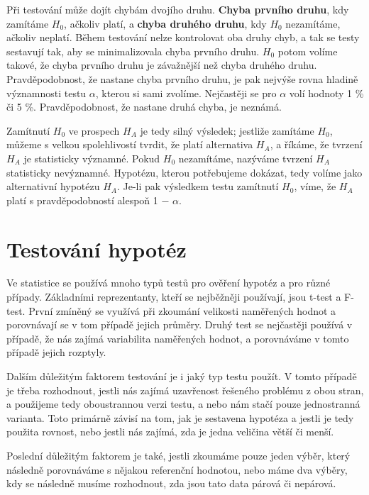 \documentclass[thesis=M,czech]{FITthesis}[2022/10/08]
\begin{document}
Při testování může dojít chybám dvojího druhu. \textbf{Chyba prvního druhu}, kdy zamítáme $H_0$, ačkoliv platí, a \textbf{chyba druhého druhu}, kdy $H_0$ nezamítáme, ačkoliv neplatí. Během testování nelze kontrolovat oba druhy chyb, a tak se testy sestavují tak, aby se minimalizovala chyba prvního druhu. $H_0$  potom volíme takové, že chyba prvního druhu je závažnější než chyba druhého druhu. Pravděpodobnost, že nastane chyba prvního druhu, je pak nejvýše rovna hladině významnosti testu $\alpha$, kterou si sami zvolíme. Nejčastěji se pro $\alpha$ volí hodnoty 1 \% či 5 \%. Pravděpodobnost, že nastane druhá chyba, je neznámá. 

Zamítnutí $H_0$ ve prospech $H_A$ je tedy silný výsledek; jestliže zamítáme $H_0$, můžeme s velkou spolehlivostí tvrdit, že platí alternativa $H_A$, a říkáme, že tvrzení $H_A$ je statisticky významné. Pokud $H_0$ nezamítáme, nazýváme tvrzení $H_A$ statisticky nevýznamné. Hypotézu, kterou potřebujeme dokázat, tedy volíme jako alternativní hypotézu $H_A$. Je-li pak výsledkem testu zamítnutí $H_0$, víme, že $H_A$ platí s pravděpodobností alespoň 1 − $\alpha$.\cite{blazek}

\section{Testování hypotéz}

Ve statistice se používá mnoho typů testů pro ověření hypotéz a pro různé případy. Základními reprezentanty, kteří se nejběžněji používají, jsou t-test a F-test. První zmíněný se využívá při zkoumání velikosti naměřených hodnot a porovnávají se v tom případě jejich průměry. Druhý test se nejčastěji používá v případě, že nás zajímá variabilita naměřených hodnot, a porovnáváme v tomto případě jejich rozptyly. 

Dalším důležitým faktorem testování je i jaký typ testu použít. V tomto případě je třeba rozhodnout, jestli nás zajímá uzavřenost řešeného problému z obou stran, a použijeme tedy oboustrannou verzi testu, a nebo nám stačí pouze jednostranná varianta. Toto primárně závisí na tom, jak je sestavena hypotéza a jestli je tedy použita rovnost, nebo jestli nás zajímá, zda je jedna veličina větší či menší.

Poslední důležitým faktorem je také, jestli zkoumáme pouze jeden výběr, který následně  porovnáváme s nějakou referenční hodnotou, nebo máme dva výběry, kdy se následně musíme rozhodnout, zda jsou tato data párová či nepárová.
\end{document}
